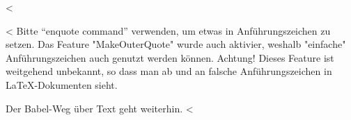 <%

<%
Bitte \enquote{enquote command} verwenden, um etwas in Anführungszeichen zu setzen.
Das Feature "MakeOuterQuote" wurde auch aktivier, weshalb "einfache" Anführungszeichen auch genutzt werden können.
Achtung! Dieses Feature ist weitgehend unbekannt, so dass man ab und an falsche Anführungszeichen in \LaTeX-Dokumenten sieht.

Der Babel-Weg über \glqq{}Text\grqq{} geht weiterhin.
<%
